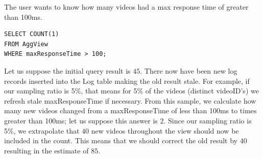 The user wants to know how many videos had a max response time of greater than 100ms.
\begin{lstlisting} 
SELECT COUNT(1)
FROM AggView
WHERE maxResponseTime > 100;
\end{lstlisting}
Let us suppose the initial query result is $45$.
There now have been new log records inserted into the Log table making the old result stale.
For example, if our sampling ratio is 5\%, that means for 5\% of the videos (distinct videoID's) we refresh stale maxResponseTime if necessary.
From this sample, we calculate how many new videos changed from a maxResponseTime of less than 100ms to times greater than 100ms; let us suppose this answer is $2$.
Since our sampling ratio is 5\%, we extrapolate that $40$ new videos throughout the view should now be included in the count.
This means that we should correct the old result by $40$ resulting in the estimate of $85$.